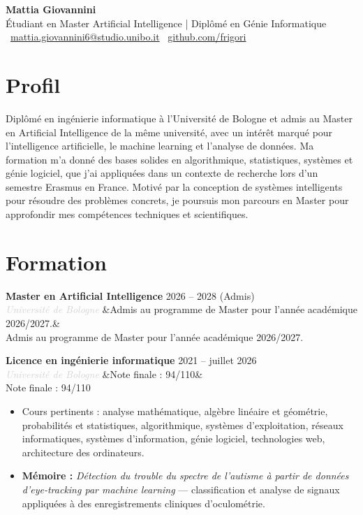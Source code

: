 \documentclass[a4paper,10pt]{article}
\newcommand{\entry}[4]{%
  \noindent\textbf{#1} \hfill \textcolor{accent}{#2}\\
  \textit{\textcolor{lightgray}{#3}}%
  \ifx&#4&\else\\\vspace{0.2em}#4\fi
  \vspace{0.5em}
}
\newcommand{\entrylist}[5]{%
  \noindent\textbf{#1} \hfill \textcolor{accent}{#2}\\
  \textit{\textcolor{lightgray}{#3}}%
  \ifx&#4&\else\\\vspace{0.2em}#4\fi
  \vspace{0.3em}
  \begin{itemize}#5\end{itemize}
  \vspace{0.3em}
}
\begin{document}
\begin{center}
  {\Huge\bfseries\color{darkgray} Mattia Giovannini}\\[0.4em]
  {\large\color{accent} Étudiant en Master Artificial Intelligence | Diplômé en Génie Informatique}\\[0.7em]
  \textcolor{lightgray}{
    \faEnvelope\ \href{mailto:mattia.giovannini6@studio.unibo.it}{mattia.giovannini6@studio.unibo.it}
    \quad\textbullet\quad
    \faGithub\ \href{https://github.com/frigori}{github.com/frigori}
  }
\end{center}

\vspace{0.5em}

\section{Profil}

Diplômé en ingénierie informatique à l'Université de Bologne et admis au Master en Artificial Intelligence de la même université, avec un intérêt marqué pour l'intelligence artificielle, le machine learning et l'analyse de données. Ma formation m'a donné des bases solides en algorithmique, statistiques, systèmes et génie logiciel, que j'ai appliquées dans un contexte de recherche lors d'un semestre Erasmus en France. Motivé par la conception de systèmes intelligents pour résoudre des problèmes concrets, je poursuis mon parcours en Master pour approfondir mes compétences techniques et scientifiques.

\section{Formation}

\entry{Master en Artificial Intelligence}{2026 -- 2028 (Admis)}{Université de Bologne}
{Admis au programme de Master pour l'année académique 2026/2027.}

\entrylist{Licence en ingénierie informatique}{2021 -- juillet 2026}{Université de Bologne}{Note finale : 94/110}{
  \item Cours pertinents : analyse mathématique, algèbre linéaire et géométrie, probabilités et statistiques, algorithmique, systèmes d'exploitation, réseaux informatiques, systèmes d'information, génie logiciel, technologies web, architecture des ordinateurs.
  \item \textbf{Mémoire :} \textit{Détection du trouble du spectre de l'autisme à partir de données d'eye-tracking par machine learning} — classification et analyse de signaux appliquées à des enregistrements cliniques d'oculométrie.
}
\end{document}
